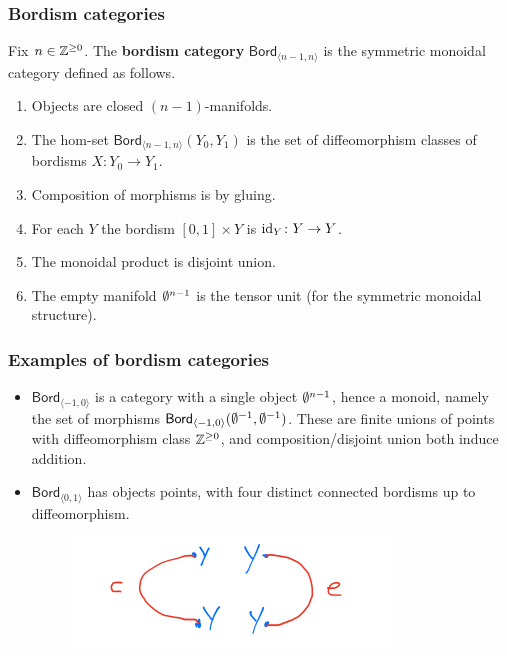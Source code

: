 \documentclass[xcolor=dvipsnames]{beamer}
\begin{document}
\begin{frame}
    \frametitle{Bordism categories} 
    \begin{definition}[]
    Fix $n \in \mathbb{Z}^{\geq 0}$. The \textbf{bordism category} $\mathsf{Bord} _{\langle n-1,n \rangle }$ is the symmetric monoidal category defined as follows.
    \begin{enumerate}
\item Objects are closed $(n-1)$-manifolds.
\item The hom-set $\mathsf{Bord} _{\langle n-1,n \rangle }(Y_0,Y_1)$ is the set of diffeomorphism classes of bordisms $X \colon Y_0 \to Y_1$.
\item Composition of  morphisms is by gluing.
\item For each $Y$ the bordism $[0,1] \times Y$ is $\operatorname{id}_Y \colon Y \to Y$.
\item The monoidal product is disjoint union.
\item The empty manifold $\emptyset ^{n-1}$ is the tensor unit (for the symmetric monoidal structure).
    \end{enumerate}
\end{definition}
\end{frame}

\begin{frame}
    \frametitle{Examples of bordism categories} 
    \begin{example}
        \begin{itemize}
            \item $\mathsf{Bord} _{\langle -1,0 \rangle }$ is a category with a single object $\emptyset ^{n-1}$, hence a monoid, namely the set of morphisms $\mathsf{Bord} _{\langle -1,0 \rangle }(\emptyset^{-1},\emptyset^{-1})$. These are finite unions of points with diffeomorphism class $\mathbb{Z} ^{\geq 0}$, and composition/disjoint union both induce addition. 
            \item $\mathsf{Bord} _{\langle 0,1 \rangle }$ has objects points, with four distinct connected bordisms up to diffeomorphism.
                \begin{figure}[H]
                \centering
                 \includegraphics[width=0.6\linewidth]{../figures/evcoev.png}
                \end{figure}
        \end{itemize}
    \end{example}
\end{frame}
\end{document}
